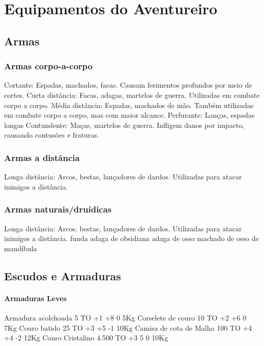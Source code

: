 \chapter{\label{ch:equipamentos}Equipamentos do Aventureiro}



\section{\label{sec:armas}Armas}


\subsection{\label{sec:armasCorpoAcorpo}Armas corpo-a-corpo}

Cortante: Espadas, machados, facas. Causam ferimentos profundos por meio de cortes.
Curta distância: Facas, adagas, martelos de guerra. Utilizadas em combate corpo a corpo.
Média distância: Espadas, machados de mão. Também utilizadas em combate corpo a corpo, mas com maior alcance.
Perfurante: Lanças, espadas longas
Contundente: Maças, martelos de guerra. Infligem danos por impacto, causando contusões e fraturas.



\subsection{\label{sec:armasDistancia}Armas a distância}
Longa distância: Arcos, bestas, lançadores de dardos. Utilizadas para atacar inimigos a distância.


\subsection{\label{sec:armasDistancia}Armas naturais/druídicas}
Longa distância: Arcos, bestas, lançadores de dardos. Utilizadas para atacar inimigos a distância.
funda
adaga de obsidiana
adaga de osso
machado de osso de mandíbula


\section{Escudos e Armaduras}

\subsubsection{\label{sec:armadLeves}Armaduras Leves}
Armadura acolchoada 	5 TO 	+1 	+8 	0 	5Kg
Corselete de couro 	10 TO 	+2 	+6 	0 	7Kg
Couro batido 	25 TO 	+3 	+5 	-1 	10Kg
Camisa de cota de Malha 	100 TO 	+4 	+4 	-2 	12Kg
Couro Cristalino 	4.500 TO 	+3 	5 	0 	10Kg

